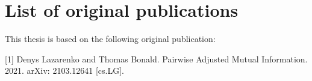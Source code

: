 \clearpage
\chapter*{List of original publications}


This thesis is based on the following original publication:

[1] Denys Lazarenko and Thomas Bonald. Pairwise Adjusted Mutual Information.
2021. arXiv: 2103.12641 [cs.LG].

\clearpage
\thispagestyle{empty}